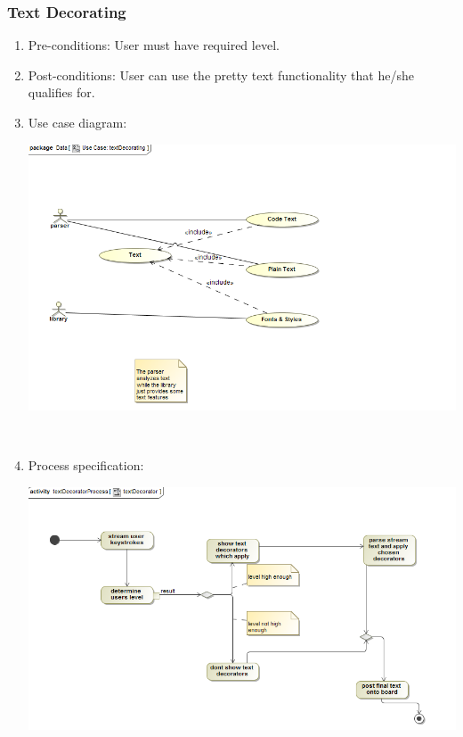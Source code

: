\documentclass[hidelinks, 12pt, oneside]{article}
\begin{document}
\subsubsection{Text Decorating}
\begin{enumerate}
 \item Pre-conditions: User must have required level.

\item Post-conditions: User can use the pretty text functionality that he/she qualifies for. 

 \item Use case diagram:\\
  \centerline{\includegraphics[scale=0.4]{textDecorator}}\\
 \item Process specification:\\
  \centerline{\includegraphics[scale=0.4]{textDecoratorProcess}}\\

\end{enumerate}
\end{document}
